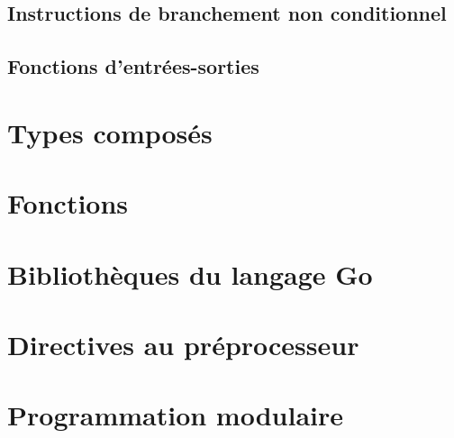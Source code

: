 \documentclass[11pt]{article}
\begin{document}
\subsection{Instructions de branchement non conditionnel}

\subsection{Fonctions d'entrées-sorties}

\section{Types composés}

\section{Fonctions}

\section{Bibliothèques du langage Go}

\section{Directives au préprocesseur}

\section{Programmation modulaire}
\end{document}
